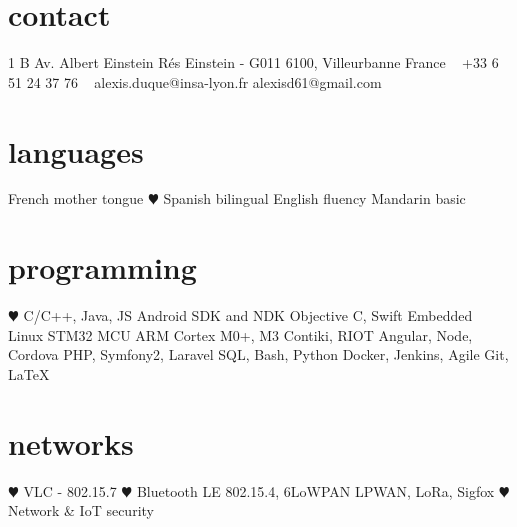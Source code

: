 \documentclass[]{cv-style}          %
\begin{document}
\lastupdated


\begin{aside}
%
\section{contact}
1 B Av. Albert Einstein
Rés Einstein - G011
6100, Villeurbanne
France
~
+33 6 51 24 37 76
~
alexis.duque@insa-lyon.fr
alexisd61@gmail.com
%
\section{languages}
French mother tongue
{\color{red} $\varheartsuit$} Spanish bilingual
English fluency
Mandarin basic
%
\section{programming}
{\color{red} $\varheartsuit$} C/C++, Java, JS
Android SDK and NDK
Objective C, Swift
Embedded Linux
STM32 MCU
ARM Cortex M0+, M3
Contiki, RIOT
Angular, Node, Cordova
PHP, Symfony2, Laravel
SQL, Bash, Python
Docker, Jenkins, Agile
Git, \LaTeX{}
%
\section{networks}
{\color{red} $\varheartsuit$} VLC - 802.15.7
{\color{red} $\varheartsuit$} Bluetooth LE
802.15.4, 6LoWPAN
LPWAN, LoRa, Sigfox
{\color{red} $\varheartsuit$} Network \& IoT security
%
\end{aside}





\vspace{0.15cm}
\end{document}
